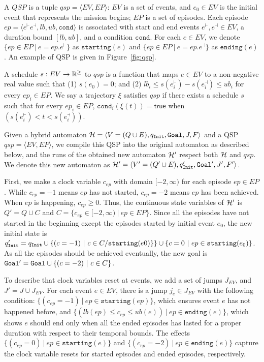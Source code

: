 \documentclass[sigconf]{acmart}
\newcommand{\true}{\mathsf{true}}
\begin{document}
A $QSP$ is a tuple $qsp = \langle EV, EP \rangle$: $EV$ is a set of events, and $e_0 \in EV$ is the initial event that represents the mission begins; $EP$ is a set of episodes. Each episode $ep =\langle e^\vdash e^\dashv, lb, ub, \texttt{cond}  \rangle$ is associated with start and end events $e^\vdash, e^\dashv \in EV$, a duration bound $[lb, ub]$, and a condition $\texttt{cond}$. For each $e \in EV$, we denote $\{ep \in EP \ | \ e = ep.e^\vdash \}$ as $\texttt{starting}(e)$ and $\{ep \in EP \ | \ e = ep.e^\dashv \}$ as $\texttt{ending}(e)$. An example of QSP is given in Figure~\ref{fig:qsp}.


A schedule $s: EV \rightarrow \mathbb{R}^\geq$ to $qsp$ is a function that maps $e \in EV$ to a non-negative real value such that (1) $s(e_0) = 0$; and (2) $lb_i \leq s(e_i^\vdash) - s(e_i^\dashv) \leq ub_i$ for every $ep_i \in EP$. We say a trajectory $\xi$ satisfies $qsp$ if there exists a schedule $s$ such that for every $ep_i \in EP$, $\texttt{cond}_i(\xi(t)) =\true$  when $(s(e^\vdash_i) < t < s(e^\dashv_i))$.

Given a hybrid automaton $\mathcal{H} = \langle V = (Q \cup E), q_\mathtt{Init}, \mathtt{Goal}, J, F \rangle $ and a QSP $qsp = \langle EV, EP \rangle$, we compile this QSP into the original automaton as described below, and the runs of the obtained new automaton $\mathcal{H}'$ respect both $\mathcal{H}$ and $qsp$. We denote this new automaton as $\mathcal{H}' = \langle V' = (Q'\cup E), q_\mathtt{Init}', \mathtt{Goal}', J', F'\rangle$.

First, we make a clock variable $c_{ep}$ with domain $[-2, \infty)$ for each episode $ep \in EP$. While $c_{ep} = -1$ means $ep$ has not started, $c_{ep} = -2$ means $ep$ has been achieved. When $ep$ is happening, $c_{ep} \geq 0$. Thus, the continuous state variables of $\mathcal{H}'$ is $Q' = Q \cup C$ and $C  = \{c_{ep} \in [-2, \infty) \ | \ ep \in EP \}$. Since all the episodes have not started in the beginning except the episodes started by initial event $e_0$, the new initial state is $\init' = \init \cup \{(c = -1) \ | \ c \in C/\texttt{starting}(e0)\} \} \cup \{c = 0 \ | \ ep \in \texttt{starting}(e_0)\}$. As all the episodes should be achieved eventually, the new goal is $\mathtt{Goal}' = \mathtt{Goal} \cup \{(c = -2) \ | \ c \in C \}$.

To describe that clock variables reset at events, we add a set of jumps $J_{EV}$, and $J' = J \cup J_{EV}$.  For each event $e \in EV$, there is a jump $j_e \in J_{EV}$ with the following condition: $\{(c_{ep} = -1) \ | \ ep \in \texttt{starting}(ep)\}$, which ensures event $e$ has not happened before, and  $\{ (lb(ep) \leq c_{ep} \leq ub(e)) \ | \ ep \in \texttt{ending}(e) \}$, which shows $e$ should end only when all the ended episodes has lasted for a proper duration with respect to their temporal bounds. The effects $\{(c_{ep} = 0) \ | \ ep \in \texttt{starting}(e)\}$ and $\{(c_{ep} = -2) \ | \ ep \in \texttt{ending}(e)\}$ capture the clock variable resets for started episodes and ended episodes, respectively.
\end{document}
